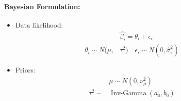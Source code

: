 \documentclass{article}
\begin{document}
\paragraph{Bayesian Formulation:}
\begin{itemize}
    \item Data likelihood:
        \begin{align}
            &\hat{\beta_i}=\theta_i+\epsilon_i \\
            \theta_i\sim N(\mu, &\tau^2) \quad \epsilon_i\sim N(0, \hat{\sigma}^2_i)
        \end{align}
    \item Priors:
        \begin{align}
            &\mu\sim N(0, \nu_{\mu}^2) \\
            \tau^2\sim &\operatorname{Inv-Gamma}(a_0,b_0)
        \end{align}
\end{itemize}

%
%
\end{document}
